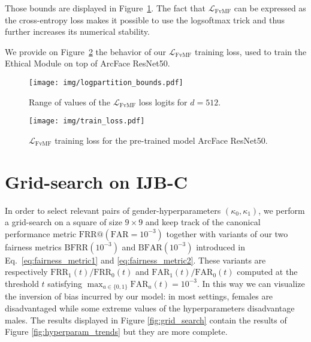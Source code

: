 \documentclass[nohyperref]{article}
\theoremstyle{plain}
\theoremstyle{definition}
\theoremstyle{remark}
\begin{document}
Those bounds are displayed in Figure~\ref{fig:vMF_logpartition_bounds}. The fact that $\mathcal{L}_\text{FvMF}$ can be expressed as the cross-entropy loss makes it possible to use the logsoftmax trick and thus further increases its numerical stability. 

We provide on Figure~\ref{fig:train_loss} the behavior of our $\mathcal{L}_\text{FvMF}$ training loss, used to train the Ethical Module on top of ArcFace ResNet50.



\begin{figure}[ht!]
    \centering
    \texttt{[image: img/logpartition\_bounds.pdf]}
    \caption{Range of values of the $\mathcal{L}_\text{FvMF}$ loss logits for $d = 512$.}
    \label{fig:vMF_logpartition_bounds}
\end{figure}

\begin{figure}[ht!]
    \centering
    \texttt{[image: img/train\_loss.pdf]}
    \caption{$\mathcal{L}_\text{FvMF}$ training loss for the pre-trained model ArcFace ResNet50.}
    \label{fig:train_loss}
\end{figure}



\section{Grid-search on IJB-C}\label{app:grid_search_2d}

In order to select relevant pairs of gender-hyperparameters $(\kappa_0, \kappa_1)$, we perform a grid-search on a square of size $9 \times 9$ and keep track of the canonical performance metric $\mathrm{FRR}@(\mathrm{FAR}=10^{-3})$ together with variants of our two fairness metrics $\mathrm{BFRR}(10^{-3})$ and $\mathrm{BFAR}(10^{-3})$ introduced in Eq.~\ref{eq:fairness_metric1} and \ref{eq:fairness_metric2}. These variants are respectively $\mathrm{FRR}_1(t) / \mathrm{FRR}_0(t)$ and $\mathrm{FAR}_1(t) / \mathrm{FAR}_0(t)$ computed at the threshold $t$ satisfying $\max_{a \in \{0, 1\}} \mathrm{FAR}_a(t) = 10^{-3}$. In this way we can visualize the inversion of bias incurred by our model: in most settings, females are disadvantaged while some extreme values of the hyperparameters disadvantage males. The results displayed in Figure \ref{fig:grid_search} contain the results of Figure \ref{fig:hyperparam_trends} but they are more complete.
\end{document}
